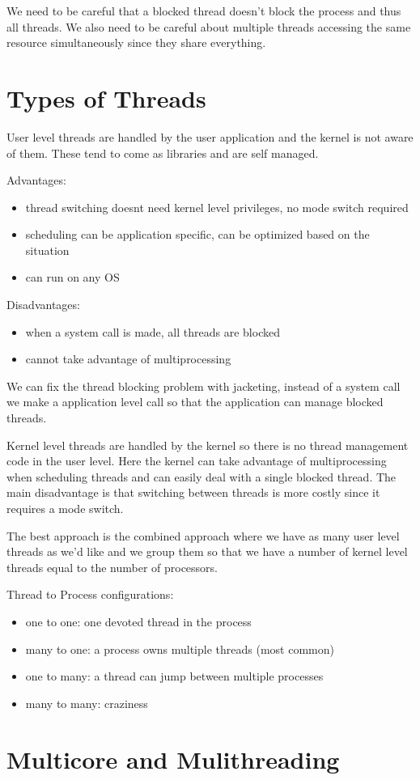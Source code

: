 \documentclass[12pt]{article}
\begin{document}
We need to be careful that a blocked thread doesn't block the process and thus all threads. We also need to be careful about multiple threads accessing the same resource simultaneously since they share everything.

\section{Types of Threads}

User level threads are handled by the user application and the kernel is not aware of them. These tend to come as libraries and are self managed.

Advantages:
\begin{itemize}
     \item thread switching doesnt need kernel level privileges, no mode switch required
     \item scheduling can be application specific, can be optimized based on the situation
     \item can run on any OS
\end{itemize}

Disadvantages:
\begin{itemize}
    \item when a system call is made, all threads are blocked %
    \item cannot take advantage of multiprocessing
\end{itemize}

We can fix the thread blocking problem with jacketing, instead of a system call we make a application level call so that the application can manage blocked threads.

Kernel level threads are handled by the kernel so there is no thread management code in the user level. Here the kernel can take advantage of multiprocessing when scheduling threads and can easily deal with a single blocked thread. The main disadvantage is that switching between threads is more costly since it requires a mode switch.

The best approach is the combined approach where we have as many user level threads as we'd like and we group them so that we have a number of kernel level threads equal to the number of processors.

Thread to Process configurations:
\begin{itemize}
    \item one to one: one devoted thread in the process
    \item many to one: a process owns multiple threads (most common)
    \item one to many: a thread can jump between multiple processes
    \item many to many: craziness
\end{itemize}


\section{Multicore and Mulithreading}
\end{document}
